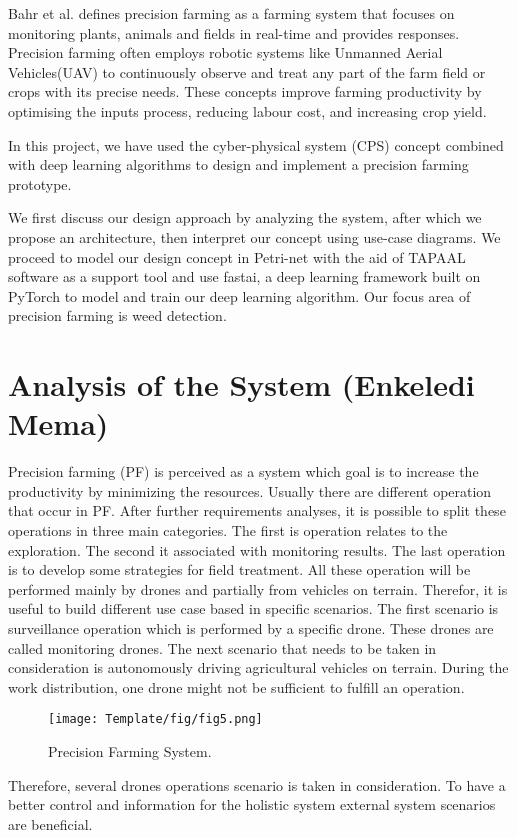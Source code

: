 \documentclass[english]{lni}
\begin{document}
Bahr et al.\cite{bahr2015eip} defines precision farming as a farming system that focuses on monitoring plants, animals and fields in real-time and provides responses. Precision farming often employs robotic systems like Unmanned Aerial Vehicles(UAV) to continuously observe and treat any part of the farm field or crops with its precise needs\cite{razaak2019integrated}. These concepts improve farming productivity by optimising the inputs process, reducing labour cost, and increasing crop yield.

In this project, we have used the cyber-physical system (CPS) concept combined with deep learning algorithms to design and implement a precision farming prototype.

We first discuss our design approach by analyzing the system, after which we propose an architecture, then interpret our concept using use-case diagrams. We proceed to model our design concept in Petri-net with the aid of TAPAAL software as a support tool and use fastai\cite{howard2020fastai}, a deep learning framework built on PyTorch to model and train our deep learning algorithm. Our focus area of precision farming is weed detection.

\section{Analysis of the System (Enkeledi Mema)}
Precision farming (PF) is perceived as a system which goal is to increase the productivity by minimizing the resources. Usually there are different operation that occur in PF. After further requirements analyses, it is possible to split these operations in three main categories. The first is operation relates to the exploration. The second it associated with monitoring results. The last operation is to develop some strategies for field treatment. All these operation will be performed mainly by drones and partially from vehicles on terrain. Therefor, it is useful to build different use case based in specific scenarios. The first scenario is surveillance operation which is performed by a specific drone. These drones are called monitoring drones. The next scenario that needs to be taken in consideration is autonomously driving agricultural vehicles on terrain. During the work distribution, one drone might not be sufficient to fulfill an operation.

\begin{figure}[h]
    \texttt{[image: Template/fig/fig5.png]}
    \centering
    \caption{Precision Farming System.}
\end{figure} 
Therefore, several drones operations scenario is taken in consideration. To have a better control and information for the holistic system external system scenarios are beneficial\cite{article}.
\end{document}
